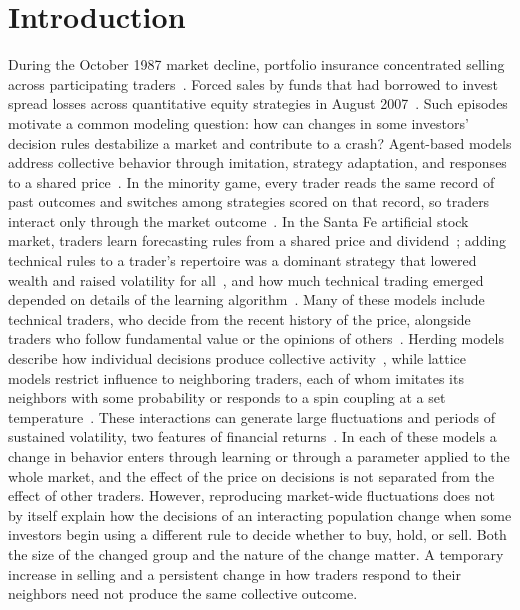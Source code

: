 \section{Introduction}

During the October 1987 market decline, portfolio insurance concentrated
selling across participating traders~\cite{shiller1988portfolio,grossman1988analysis}.
Forced sales by funds that had borrowed to invest spread losses across
quantitative equity strategies in August 2007~\cite{khandani2011what}.
Such episodes motivate a common modeling question: how can changes in
some investors' decision rules destabilize a market and contribute to
a crash? Agent-based
models address collective behavior through imitation, strategy adaptation,
and responses to a shared price~\cite{lebaron2006agent,hommes2006heterogeneous,samanidou2007agent,axtell2025agent}.
In the minority game, every trader reads the same record of past outcomes
and switches among strategies scored on that record, so traders interact
only through the market outcome~\cite{challet1997minority,challet2000modeling}.
In the Santa Fe artificial stock market, traders learn forecasting rules
from a shared price and dividend~\cite{lebaron1999time}; adding technical
rules to a trader's repertoire was a dominant strategy that lowered wealth
and raised volatility for all~\cite{joshi1999technical,joshi2002financial},
and how much technical trading emerged depended on details of the learning
algorithm~\cite{ehrentreich2006technical}.
Many of these models include technical traders, who decide from the recent
history of the price, alongside traders who follow fundamental value or the
opinions of others~\cite{brock1998heterogeneous,lux1999scaling,hommes2006heterogeneous}.
Herding models describe how individual decisions produce collective
activity~\cite{kirman1993ants,cont2000herd,lux1999scaling}, while lattice
models restrict influence to neighboring traders, each of whom imitates its
neighbors with some probability or responds to a spin coupling at a set
temperature~\cite{bornholdt2001ising,iori2002microsimulation,bartolozzi2004stochastic,qiu2007cellular,sornette2006importance}.
These interactions can generate large fluctuations and periods of sustained
volatility, two features of financial returns~\cite{cont2001empirical}.
In each of these models a change in behavior enters through learning or
through a parameter applied to the whole market, and the effect of the price
on decisions is not separated from the effect of other traders.
However, reproducing market-wide fluctuations does not by itself explain
how the decisions of an interacting population change when some
investors begin using a different rule to decide whether to buy, hold,
or sell. Both the size of the changed group and the nature of the change matter. A temporary increase in selling
and a persistent change in how traders respond to their neighbors need
not produce the same collective outcome.

